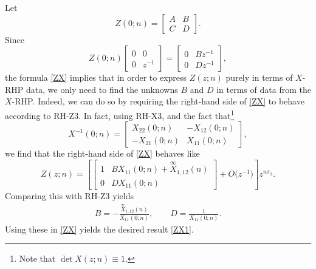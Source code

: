 \documentclass[pdftex]{sigma}
\numberwithin{equation}{section}
\begin{document}
	Let \begin{equation*}
		Z(0;n) = \begin{bmatrix}
			A & B \\
			C & D
		\end{bmatrix}.
	\end{equation*}
	Since
	\[ Z(0;n) \begin{bmatrix}
		0 & 0 \\
		0 & z^{-1}
	\end{bmatrix} = \begin{bmatrix}
		0 & Bz^{-1} \\
		0 & Dz^{-1}
	\end{bmatrix}, \]
	the formula \eqref{ZX} implies that in order to express $Z(z;n)$ purely in terms of $X$-RHP data, we only need to find the unknowns $B$ and $D$ in terms of data from the $X$-RHP. Indeed, we can do so by requiring the right-hand side of \eqref{ZX} to behave according to {\rm RH-Z3}. In fact, using {\rm RH-X3}, and the fact that\footnote{Note that $\det X(z;n) \equiv 1$.}
	\begin{equation*}
		X^{-1}(0;n) = \begin{bmatrix}
			X_{22}(0;n) & -X_{12}(0;n) \\
			-X_{21}(0;n) & X_{11}(0;n)
		\end{bmatrix},
	\end{equation*}
	we find that the right-hand side of \eqref{ZX} behaves like
	\begin{equation*}
		Z(z;n) = \left[ \begin{bmatrix}
			1 & B X_{11}(0;n)+\overset{\infty}{X}_{1,12}(n) \\
			0 & D X_{11}(0;n)
		\end{bmatrix} + O\big(z^{-1}\big) \right] z^{n\sigma_3}.
	\end{equation*}
	Comparing this with {\rm RH-Z3} yields
	\begin{align*}
		B = - \frac{\overset{\infty}{X}_{1,12}(n)}{X_{11}(0;n)}, \qquad
		D = \frac{1}{X_{11}(0;n)}.
	\end{align*}
	Using these in \eqref{ZX} yields the desired result \eqref{ZX1}.
	
\end{document}
